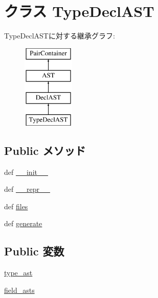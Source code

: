\hypertarget{classslicc_1_1ast_1_1TypeDeclAST_1_1TypeDeclAST}{
\section{クラス TypeDeclAST}
\label{classslicc_1_1ast_1_1TypeDeclAST_1_1TypeDeclAST}
}
TypeDeclASTに対する継承グラフ:\begin{figure}[H]
\begin{center}
\leavevmode
\includegraphics[height=4cm]{classslicc_1_1ast_1_1TypeDeclAST_1_1TypeDeclAST}
\end{center}
\end{figure}
\subsection*{Public メソッド}
\begin{DoxyCompactItemize}
\item 
def \hyperlink{classslicc_1_1ast_1_1TypeDeclAST_1_1TypeDeclAST_ac775ee34451fdfa742b318538164070e}{\_\-\_\-init\_\-\_\-}
\item 
def \hyperlink{classslicc_1_1ast_1_1TypeDeclAST_1_1TypeDeclAST_ad8b9328939df072e4740cd9a63189744}{\_\-\_\-repr\_\-\_\-}
\item 
def \hyperlink{classslicc_1_1ast_1_1TypeDeclAST_1_1TypeDeclAST_a35b1a87f6fcbddeb5b793b0e415765f8}{files}
\item 
def \hyperlink{classslicc_1_1ast_1_1TypeDeclAST_1_1TypeDeclAST_a4555d1cee0dccf3942ea35fe86de2e8e}{generate}
\end{DoxyCompactItemize}
\subsection*{Public 変数}
\begin{DoxyCompactItemize}
\item 
\hyperlink{classslicc_1_1ast_1_1TypeDeclAST_1_1TypeDeclAST_a2c41e611550596541faa6f64ffecc139}{type\_\-ast}
\item 
\hyperlink{classslicc_1_1ast_1_1TypeDeclAST_1_1TypeDeclAST_a8e457a9b10e027613a506f345d3b9eee}{field\_\-asts}
\end{DoxyCompactItemize}


